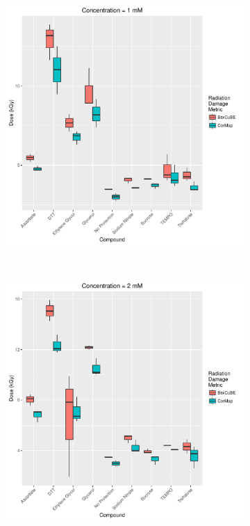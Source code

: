 \begin{figure}
    \centering
    \begin{subfigure}[b]{0.75\textwidth}
            \centering
            \includegraphics[width=\textwidth]{figures/saxs/Conc_1_dose.pdf}
            \caption{}
            \label{fig:SAXS Metric comparison - 1mM}
    \end{subfigure}
    \\
    \begin{subfigure}[b]{0.75\textwidth}
            \centering
            \includegraphics[width=\textwidth]{figures/saxs/Conc_2_dose.pdf}
            \caption{}
            \label{fig:SAXS Metric comparison - 2mM}
    \end{subfigure}
\end{figure}
